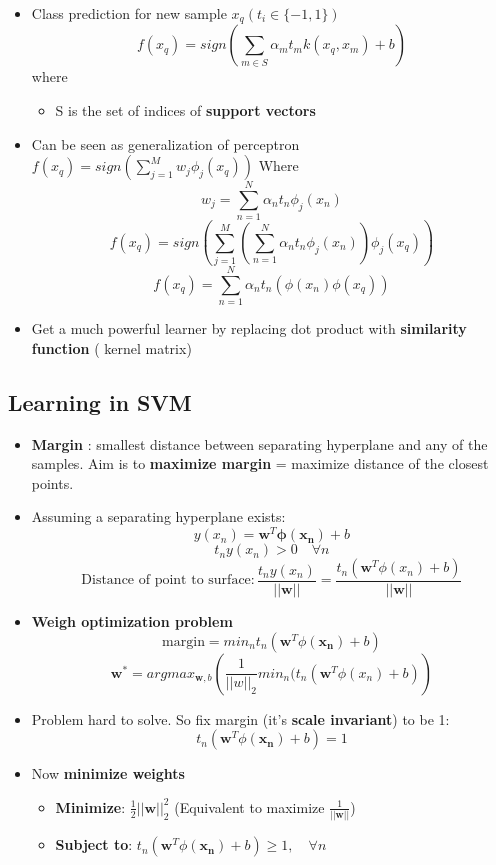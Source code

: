 \documentclass[12pt]{article} %
\begin{document}
\begin{itemize}
\item Class prediction for new sample $x_q (t_i \in \{-1,1 \})$
$$ f(x_q) = sign \left( \sum \limits_{m \in S} \alpha_mt_mk(x_q,x_m) + b \right)$$
where \begin{itemize}
\item S is the set of indices of \textbf{support vectors}
\end{itemize}

\item Can be seen as generalization of perceptron $f(x_q) =sign \left( \sum \limits_{j=1}^M w_j\phi_j(x_q) \right)$
Where 
$$ w_j = \sum \limits_{n=1}^N \alpha_nt_n\phi_j(x_n)$$
$$ f(x_q) =sign \left( \sum \limits_{j=1}^M \left( \sum \limits_{n=1}^N \alpha_nt_n\phi_j(x_n)\right) \phi_j(x_q) \right) $$
$$ f(x_q) =  \sum \limits_{n=1}^N \alpha_nt_n \left( \phi(x_n) \phi(x_q) \right)$$

\item Get a much powerful learner by replacing dot product with \textbf{similarity function} ( kernel matrix)
\end{itemize}


\subsection{Learning in SVM}
\begin{itemize}
\item \textbf{Margin }: smallest distance between separating hyperplane and any of the samples. Aim is to \textbf{maximize margin} = maximize distance of the closest points.

\item Assuming a separating hyperplane exists:
$$ y(x_n) = \bm{w}^T\bm{\phi(x_n)}+b $$
$$ t_ny(x_n) > 0 \quad \forall n$$
$$ \text{Distance of point to surface} : \frac{t_ny(x_n)}{||\bm{w}||}= \frac{t_n(\bm{w}^T\phi(x_n)+b)}{||\bm{w}||}$$ 

\item \textbf{Weigh optimization problem} 
$$ \text{margin} = min_n t_n(\bm{w}^T\phi(\bm{x_n})+b)$$
$$ \bm{w^*} = argmax_{\bm{w},b}  \left( \frac{1}{||w||_2} min_n(t_n(\bm{w}^T\phi(x_n)+b) \right)$$

\item Problem hard to solve. So fix margin (it's \textbf{scale invariant}) to be 1:
$$ t_n(\bm{w}^T\phi(\bm{x_n})+b)=1$$
\item Now \textbf{minimize weights}
\begin{itemize}
\item \textbf{Minimize}: $\frac{1}{2}||\bm{w}||_2^2 $ (Equivalent to maximize $\frac{1}{||\bm{w}||}$)
\item \textbf{Subject to}: $t_n(\bm{w}^T\phi(\bm{x_n})+b) \geq 1 ,\quad \forall n$
\end{itemize}
\end{itemize}
\end{document}
